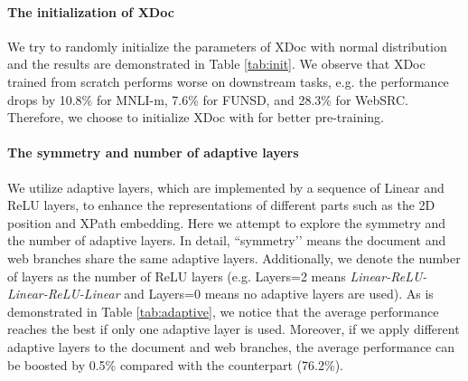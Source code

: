 \documentclass[11pt]{article}
\begin{document}
\begin{table}[t]
\centering
{}
\caption{Results on the symmetry and number of adaptive layers.  means that the document and web branches share the same adaptive layers.}
\label{tab:adaptive}
\end{table}


\paragraph{The initialization of XDoc}
We try to randomly initialize the parameters of XDoc with normal distribution and the results are demonstrated in Table \ref{tab:init}.  We observe that XDoc trained from scratch performs worse on downstream tasks, e.g. the performance drops by 10.8\% for MNLI-m, 7.6\% for FUNSD, and 28.3\% for WebSRC. Therefore, we choose to initialize XDoc with  for better pre-training.

\paragraph{The symmetry and number of adaptive layers}
We utilize adaptive layers, which are implemented by a sequence of Linear and ReLU layers, to enhance the representations of different parts such as the 2D position and XPath embedding. Here we attempt to explore the symmetry and the number of adaptive layers. In detail, ``symmetry’’ means the document and web branches share the same adaptive layers. Additionally, we denote the number of layers as the number of ReLU layers (e.g. Layers=2 means \textit{Linear-ReLU-Linear-ReLU-Linear} and Layers=0 means no adaptive layers are used). As is demonstrated in Table \ref{tab:adaptive}, we notice that the average performance reaches the best if only one adaptive layer is used. Moreover, if we apply different adaptive layers to the document and web branches, the average performance can be boosted by 0.5\% compared with the counterpart (76.2\%).
\end{document}
